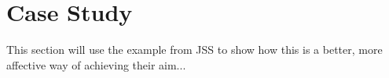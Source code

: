 \section{Case Study}
\label{sec:case}

This section will use the example from JSS to show how this is a better, more affective way of achieving their aim...

